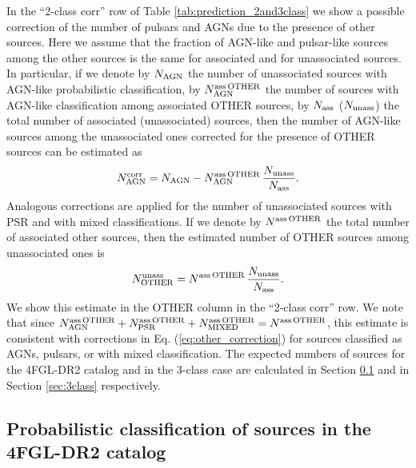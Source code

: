 \documentclass{aa}
\newcommand{\bea}{\begin{eqnarray}}
\newcommand{\eea}{\end{eqnarray}}
\newcommand{\lb}{\label}
\begin{document}
In the ``2-class corr'' row of Table \ref{tab:prediction_2and3class}
we show a possible correction of the number of pulsars and AGNs due to the presence of other sources.
Here we assume that the fraction of AGN-like and pulsar-like sources among the other sources is the same for associated and for unassociated sources.
In particular, if we denote by $N_{\rm AGN}$ the number of unassociated sources with AGN-like probabilistic classification,
by $N_{\rm AGN}^{\rm ass\,OTHER}$ the number of sources with AGN-like classification among associated OTHER sources,
by $N_{\rm ass}$ ($N_{\rm unass}$) the total number of associated (unassociated) sources, then
the number of AGN-like sources among the unassociated ones corrected for the presence of OTHER sources can be estimated as
\bea
\lb{eq:other_correction}
N_{\rm AGN}^{\rm corr} = N_{\rm AGN} - N_{\rm AGN}^{\rm ass\,OTHER} \,\frac{N_{\rm unass}}{N_{\rm ass}}.
\eea
Analogous corrections are applied for the number of unassociated sources with PSR and with mixed classifications.
If we denote by $N^{\rm ass\,OTHER}$ the total number of associated other sources, then the estimated number of 
OTHER sources among unassociated ones is
\bea
\lb{eq:2class_other}
N^{\rm unass}_{\rm OTHER} = N^{\rm ass\,OTHER} \,\frac{N_{\rm unass}}{N_{\rm ass}}.
\eea
We show this estimate in the OTHER column in the ``2-class corr'' row.
We note that since 
$N_{\rm AGN}^{\rm ass\,OTHER} + N_{\rm PSR}^{\rm ass\,OTHER} + N_{\rm MIXED}^{\rm ass\,OTHER} = N^{\rm ass\,OTHER}$,
this estimate is consistent with corrections in Eq. (\ref{eq:other_correction}) for sources classified as AGNs, pulsars, or with mixed classification.
The expected numbers of sources for the 4FGL-DR2 catalog and in the 3-class case are calculated in Section \ref{sec:4FGLprediction}
and in Section \ref{sec:3class} respectively.


\subsection{Probabilistic classification of sources in the 4FGL-DR2 catalog}
\lb{sec:4FGLprediction}
\end{document}
